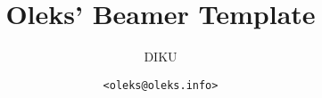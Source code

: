 \documentclass[xcolor=table]{beamer}
\title{Oleks' Beamer Template}
\subtitle{DIKU}
\author{\texttt{<oleks@oleks.info>}}
\begin{document}
\begin{frame} \titlepage \end{frame}






\end{document}
